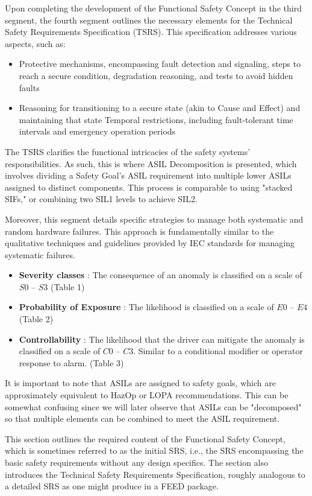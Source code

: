 \documentclass[./dissertation.tex]{subfiles}
\begin{document}
Upon completing the development of the Functional Safety Concept in the third segment, the fourth segment outlines the necessary elements for the Technical Safety Requirements Specification (TSRS). This specification addresses various aspects, such as:
\begin{itemize}
\item Protective mechanisms, encompassing fault detection and signaling, steps to reach a secure condition, degradation reasoning, and tests to avoid hidden faults
\item Reasoning for transitioning to a secure state (akin to Cause and Effect) and maintaining that state
Temporal restrictions, including fault-tolerant time intervals and emergency operation periods
\end{itemize}

The TSRS clarifies the functional intricacies of the safety systems' responsibilities. As such, this is where ASIL Decomposition is presented, which involves dividing a Safety Goal's ASIL requirement into multiple lower ASILs assigned to distinct components. This process is comparable to using "stacked SIFs," or combining two SIL1 levels to achieve SIL2.

Moreover, this segment details specific strategies to manage both systematic and random hardware failures. This approach is fundamentally similar to the qualitative techniques and guidelines provided by IEC standards for managing systematic failures.

\begin{itemize}
\item \textbf{Severity classes} : The consequence of an anomaly is classified on a scale of $S0$ – $S3$ (Table 1)
\item \textbf{Probability of Exposure} : The likelihood is classified on a scale of $E0$ – $E4$ (Table 2)
\item \textbf{Controllability} : The likelihood that the driver can mitigate the anomaly is classified on a scale of $C0$ – $C3$. Similar to a conditional modifier or operator response to alarm. (Table 3)
\end{itemize}

It is important to note that ASILs are assigned to safety goals, which are approximately equivalent to HazOp or LOPA recommendations. This can be somewhat confusing since we will later observe that ASILs can be "decomposed" so that multiple elements can be combined to meet the ASIL requirement.

This section outlines the required content of the Functional Safety Concept, which is sometimes referred to as the initial SRS, i.e., the SRS encompassing the basic safety requirements without any design specifics. The section also introduces the Technical Safety Requirements Specification, roughly analogous to a detailed SRS as one might produce in a FEED package.
\end{document}
